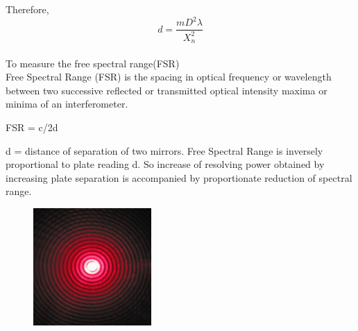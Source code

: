 \documentclass[12pt]{report}
\begin{document}
	Therefore,
	$$ d = \frac{mD^2\lambda}{X^2_n} $$\\
	To measure the free spectral range(FSR)\\ 
	Free Spectral Range (FSR) is the spacing in optical frequency or wavelength between two successive reflected or transmitted optical intensity maxima or minima of an interferometer.\\
	\begin{center}
		FSR = c/2d
	\end{center}       
	d = distance of separation of two mirrors. Free Spectral Range is inversely proportional to plate reading d. So increase of resolving power obtained by increasing plate separation is accompanied by proportionate reduction of spectral range. 
	\begin{figure}[h!]
		\centering
		\includegraphics[width=0.4\textwidth]{5.png}
	\end{figure}
	\newpage
\end{document}
